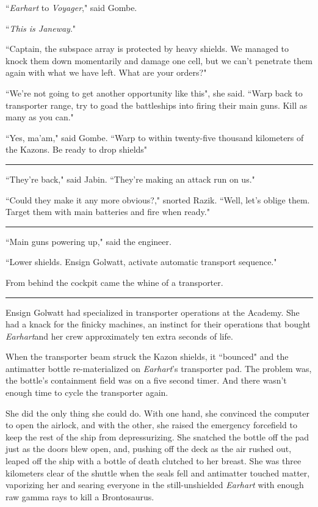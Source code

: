 \documentclass[twoside,letterpaper,12pt]{memoir}
\begin{document}
``\textit{Earhart} to \textit{Voyager}," said Gombe.

``\textit{This is Janeway}."

``Captain, the subspace array is protected by heavy shields. We managed to knock them down momentarily and damage one cell, but we can't penetrate them again with what we have left. What are your orders?"

``We're not going to get another opportunity like this", she said. ``Warp back to transporter range, try to goad the battleships into firing their main guns. Kill as many as you can."

``Yes, ma'am," said Gombe. ``Warp to within twenty-five thousand kilometers of the Kazons. Be ready to drop shields"

\fancybreak{\rule{3cm}{0.4 pt}}
``They're back," said Jabin. ``They're making an attack run on us."

``Could they make it any more obvious?," snorted Razik. ``Well, let's oblige them. Target them with main batteries and fire when ready."

\fancybreak{\rule{3cm}{0.4 pt}}
``Main guns powering up," said the engineer.

``Lower shields. Ensign Golwatt, activate automatic transport sequence."

From behind the cockpit came the whine of a transporter.

\fancybreak{\rule{3cm}{0.4 pt}}
Ensign Golwatt had specialized in transporter operations at the Academy. She had a knack for the finicky machines, an instinct for their operations that bought \textit{Earhart}and her crew approximately ten extra seconds of life.

When the transporter beam struck the Kazon shields, it ``bounced" and the antimatter bottle re-materialized on \textit{Earhart}'s transporter pad. The problem was, the bottle's containment field was on a five second timer. And there wasn't enough time to cycle the transporter again.

She did the only thing she could do. With one hand, she convinced the computer to open the airlock, and with the other, she raised the emergency forcefield to keep the rest of the ship from depressurizing. She snatched the bottle off the pad just as the doors blew open, and, pushing off the deck as the air rushed out, leaped off the ship with a bottle of death clutched to her breast. She was three kilometers clear of the shuttle when the seals fell and antimatter touched matter, vaporizing her and searing everyone in the still-unshielded \textit{Earhart} with enough raw gamma rays to kill a Brontosaurus.
\end{document}
